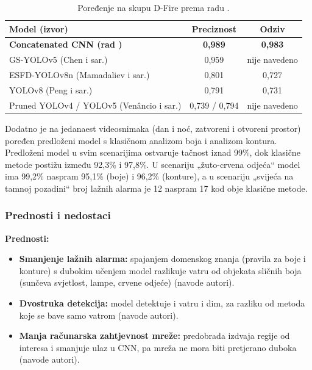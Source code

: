 \begin{table}[H]
\centering
\small
\begin{tabularx}{\linewidth}{@{}>{\raggedright\arraybackslash}X c c@{}}
  \toprule
  \textbf{Model (izvor)} & \textbf{Preciznost} & \textbf{Odziv}\\
  \midrule
  \textbf{Concatenated CNN (rad \cite{buriboev})} & \textbf{0,989} & \textbf{0,983}\\
  GS-YOLOv5 (Chen i sar.) & 0,959 & nije navedeno\\
  ESFD-YOLOv8n (Mamadaliev i sar.) & 0,801 & 0,727\\
  YOLOv8 (Peng i sar.) & 0,791 & 0,731\\
  Pruned YOLOv4 / YOLOv5 (Venâncio i sar.) & 0,739 / 0,794 & nije navedeno\\
  \bottomrule
\end{tabularx}
\caption{Poređenje na skupu D-Fire prema radu \cite{buriboev}.}
\label{tab:zijad}
\end{table}

Dodatno je na jedanaest videosnimaka (dan i noć, zatvoreni i otvoreni prostor) poređen predloženi model s klasičnom analizom boja i analizom kontura. Predloženi model u svim scenarijima ostvaruje tačnost iznad 99\%, dok klasične metode postižu između 92,3\% i 97,8\%. U scenariju „žuto-crvena odjeća“ model ima 99,2\% naspram 95,1\% (boje) i 96,2\% (konture), a u scenariju „svijeća na tamnoj pozadini“ broj lažnih alarma je 12 naspram 17 kod obje klasične metode.

\subsubsection{Prednosti i nedostaci}
\textbf{Prednosti:}
\begin{itemize}
  \item \textbf{Smanjenje lažnih alarma:} spajanjem domenskog znanja (pravila za boje i konture) s dubokim učenjem model razlikuje vatru od objekata sličnih boja (sunčeva svjetlost, lampe, crvene odjeće) (navode autori).
  \item \textbf{Dvostruka detekcija:} model detektuje i vatru i dim, za razliku od metoda koje se bave samo vatrom (navode autori).
  \item \textbf{Manja računarska zahtjevnost mreže:} predobrada izdvaja regije od interesa i smanjuje ulaz u CNN, pa mreža ne mora biti pretjerano duboka (navode autori).
\end{itemize}

